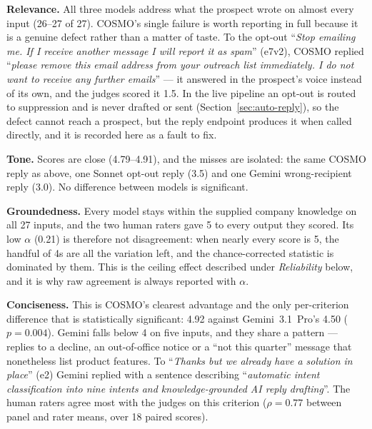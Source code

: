 \documentclass[a4paper]{article}
\begin{document}
\textbf{Relevance.} All three models address what the prospect wrote on
almost every input (26--27 of 27). COSMO's single failure is worth reporting in
full because it is a genuine defect rather than a matter of taste. To the
opt-out ``\emph{Stop emailing me. If I receive another message I will report it
as spam}'' (e7v2), COSMO replied ``\emph{please remove this email address from
your outreach list immediately. I do not want to receive any further emails}''
--- it answered in the prospect's voice instead of its own, and the judges
scored it 1.5. In the live pipeline an opt-out is routed to suppression and is
never drafted or sent (Section~\ref{sec:auto-reply}), so the defect cannot reach
a prospect, but the reply endpoint produces it when called directly, and it is
recorded here as a fault to fix.

\textbf{Tone.} Scores are close (4.79--4.91), and the misses are isolated: the
same COSMO reply as above, one Sonnet opt-out reply (3.5) and one Gemini
wrong-recipient reply (3.0). No difference between models is significant.

\textbf{Groundedness.} Every model stays within the supplied company knowledge
on all 27 inputs, and the two human raters gave 5 to every output they scored.
Its low $\alpha$ (0.21) is therefore not disagreement: when nearly every score
is 5, the handful of 4s are all the variation left, and the chance-corrected
statistic is dominated by them. This is the ceiling effect described under
\emph{Reliability} below, and it is why raw agreement is always reported with
$\alpha$.

\textbf{Conciseness.} This is COSMO's clearest advantage and the only
per-criterion difference that is statistically significant: 4.92 against
Gemini~3.1~Pro's 4.50 ($p=0.004$). Gemini falls below 4 on five inputs, and
they share a pattern --- replies to a decline, an out-of-office notice or a
``not this quarter'' message that nonetheless list product features. To
``\emph{Thanks but we already have a solution in place}'' (e2) Gemini replied
with a sentence describing ``\emph{automatic intent classification into nine
intents and knowledge-grounded AI reply drafting}''. The human raters agree most
with the judges on this criterion ($\rho=0.77$ between panel and rater means,
over 18 paired scores).
\end{document}
